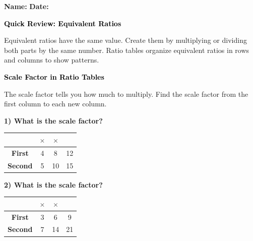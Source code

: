 \documentclass[12pt, letterpaper, fleqn]{article}
\newcommand{\blankshorter}{\underline{\hspace{1.5cm}}}
\begin{document}
\textbf{Name:} \underline{\hspace{5cm}}
\hfill
\textbf{Date:} \underline{\hspace{3cm}}\\

\begin{tcolorbox}[colback=customteal!20]
    \large\textcolor{black}{\textbf{Quick Review: Equivalent Ratios}}
\end{tcolorbox}

\vspace{3mm}

\noindent
Equivalent ratios have the same value. Create them by multiplying or dividing both parts by the same number. Ratio tables organize equivalent ratios in rows and columns to show patterns.

\vspace{1cm}

\begin{tcolorbox}[colback=customteal!20]
\large\textcolor{black}{\textbf{Scale Factor in Ratio Tables}}
\end{tcolorbox}

\noindent
The scale factor tells you how much to multiply. Find the scale factor from the first column to each new column.

\vspace{1.5cm}


\noindent
\textbf{1) What is the scale factor?}

\begin{center}
\begin{tabular}{|c|c|c|c|}
\hline
 & $\times$ \blankshorter & $\times$ \blankshorter & \\
\hline
\textbf{First} & 4 & 8 & 12 \\
\hline
\textbf{Second} & 5 & 10 & 15 \\
\hline
\end{tabular}
\end{center}

\vspace{1.5cm}


\noindent
\textbf{2) What is the scale factor?}

\begin{center}
\begin{tabular}{|c|c|c|c|}
\hline
 & $\times$ \blankshorter & $\times$ \blankshorter & \\
\hline
\textbf{First} & 3 & 6 & 9 \\
\hline
\textbf{Second} & 7 & 14 & 21 \\
\hline
\end{tabular}
\end{center}
\end{document}
